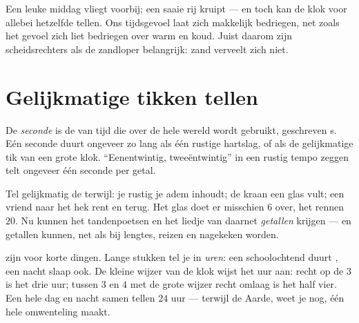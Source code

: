 \begin{remark}\label{rem:g2:measuring-time:feelings}
Een leuke middag vliegt voorbij; een saaie rij kruipt --- en toch kan
de klok voor allebei hetzelfde tellen. Ons tijdsgevoel laat zich
makkelijk bedriegen, net zoals het gevoel zich liet bedriegen over
warm en koud. Juist daarom zijn scheidsrechters als de zandloper
belangrijk: zand verveelt zich niet.
\end{remark}

\section{Gelijkmatige tikken tellen}

\begin{definition}[De seconde]\label{def:g2:measuring-time:second}
De \emph{seconde} is de  van tijd die over de
hele wereld wordt gebruikt, geschreven \unit{s}. Eén seconde duurt
ongeveer zo lang als één rustige hartslag, of als de gelijkmatige tik
van een grote klok. ``Eenentwintig, tweeëntwintig'' in een rustig
tempo zeggen telt ongeveer één seconde per getal.
\end{definition}

\begin{example}\label{ex:g2:measuring-time:count}
Tel gelijkmatig de  terwijl: je rustig je adem inhoudt; de
kraan een glas vult; een vriend naar het hek rent en terug. Het glas
doet er misschien $6$  over, het rennen $20$. Nu kunnen het
tandenpoetsen en het liedje van daarnet \emph{getallen} krijgen ---
en getallen kunnen, net als bij lengtes, reizen en nagekeken worden.
\end{example}

\begin{example}\label{ex:g2:measuring-time:clock}
 zijn voor korte dingen. Lange stukken tel je in
\emph{uren}: een schoolochtend duurt , een nacht slaap
ook. De kleine wijzer van de klok wijst het uur aan: recht op de $3$
is het drie uur; tussen $3$ en $4$ met de grote wijzer recht omlaag is
het half vier. Een hele dag en nacht samen tellen $24$ uur ---
terwijl de Aarde, weet je nog, één hele omwenteling maakt.
\end{example}

